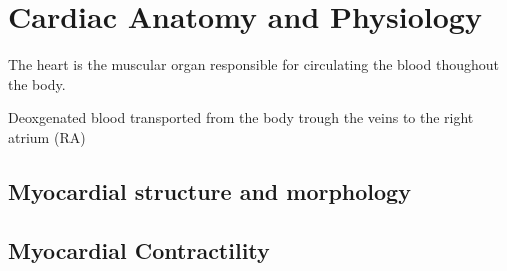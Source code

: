\section{Cardiac Anatomy and Physiology}

The heart is the muscular organ responsible for circulating the blood
thoughout the body. 

Deoxgenated blood transported from the body trough the veins to the
right atrium (RA) 



\subsection{Myocardial structure and morphology}

\subsection{Myocardial Contractility}

